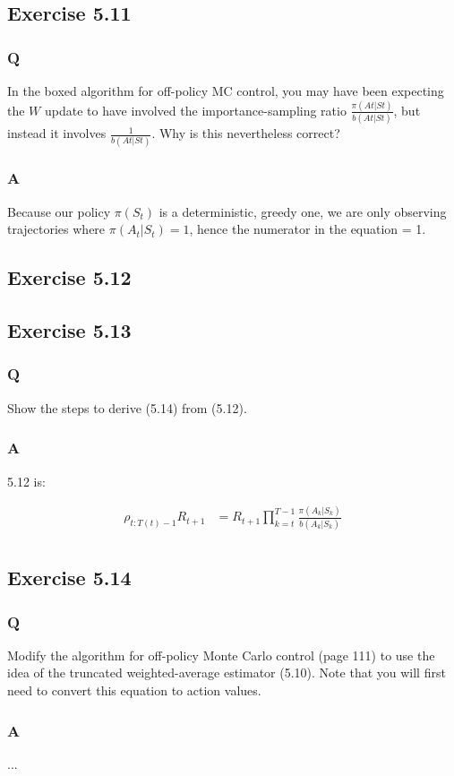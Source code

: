 \subsection{Exercise 5.11}
\subsubsection{Q}
In the boxed algorithm for off-policy MC control, you may have been expecting the $W$ update to have involved the importance-sampling ratio $\frac{\pi (At|St)}{b(At|St)}$, but
instead it involves $\frac{1}{b(At|St)}$. Why is this nevertheless correct?
\subsubsection{A}
Because our policy $\pi(S_t)$ is a deterministic, greedy one, we are only observing trajectories where $\pi(A_t | S_t) = 1$, hence the numerator in the equation = 1.

\subsection{Exercise 5.12}
\ProgrammingExercise

\subsection{Exercise 5.13}
\subsubsection{Q}
Show the steps to derive (5.14) from (5.12). 
\subsubsection{A}
5.12 is:

\begin{align}
\rho_{t:T(t)-1} R_{t+1} &= R_{t+1} \prod_{k = t}^{T-1} \frac{\pi(A_k | S_k)}{b(A_k | S_k)} \\
\end{align}

\subsection{Exercise 5.14}
\subsubsection{Q}
Modify the algorithm for off-policy Monte Carlo control (page 111) to use the idea of the truncated weighted-average estimator (5.10). Note that you will first need to convert this equation to action values.
\subsubsection{A}
...